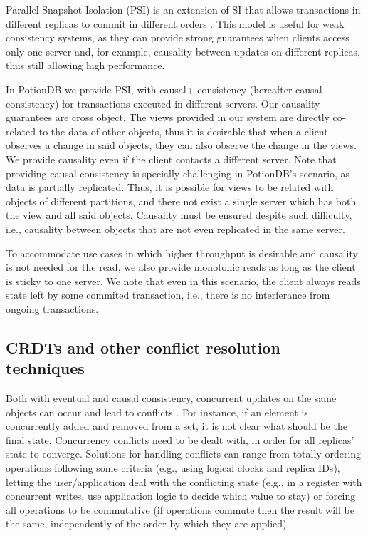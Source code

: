 Parallel Snapshot Isolation (PSI) is an extension of SI that allows transactions in different replicas to commit in different orders \cite{walter}.
This model is useful for weak consistency systems, as they can provide strong guarantees when clients access only one server and, for example, causality between updates on different replicas, thus still allowing high performance. 

In PotionDB we provide PSI, with causal+ consistency (hereafter causal consistency) for transactions executed in different servers. Our causality guarantees are cross object.
The views provided in our system are directly co-related to the data of other objects, thus it is desirable that when a client observes a change in said objects, they can also observe the change in the views.
We provide causality even if the client contacts a different server.
Note that providing causal consistency is specially challenging in PotionDB's scenario, as data is partially replicated.
Thus, it is possible for views to be related with objects of different partitions, and there not exist a single server which has both the view and all said objects.
Causality must be ensured despite such difficulty, i.e., causality between objects that are not even replicated in the same server.

To accommodate use cases in which higher throughput is desirable and causality is not needed for the read, we also provide monotonic reads as long as the client is sticky to one server.
We note that even in this scenario, the client always reads state left by some commited transaction, i.e., there is no interferance  from ongoing transactions.

\subsection{CRDTs and other conflict resolution techniques}

Both with eventual and causal consistency, concurrent updates on the same objects can occur and lead to conflicts \cite{understandingEC}.
For instance, if an element is concurrently added and removed from a set, it is not clear what should be the final state.
Concurrency conflicts need to be dealt with, in order for all replicas' state to converge.
Solutions for handling conflicts can range from totally ordering operations following some criteria (e.g., using logical clocks and replica IDs), letting the user/application deal with the conflicting state (e.g., in a register with concurrent writes, use application logic to decide which value to stay) or forcing all operations to be commutative (if operations commute then the result will be the same, independently of the order by which they are applied).


